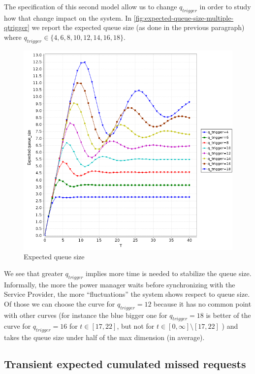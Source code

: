The specification of this second model allow us to change
$q_{trigger}$ in order to study how that change impact on the
system. In \autoref{fig:expected-queue-size-multiple-qtrigger} we
report the expected queue size (as done in the previous paragraph)
where $q_{trigger} \in \{4,6,8,10,12,14,16,18\}$.
\begin{figure}[htb]
  \centering
  \includegraphics[width=13cm]{quantitative-project/expected-queue-size-multi-q-triggers.png}
  \caption{Expected queue size}
  \label{fig:expected-queue-size-multiple-qtrigger}
\end{figure}
We see that greater $q_{trigger}$ implies more time is needed to
stabilize the queue size. Informally, the more the power manager waits
before synchronizing with the Service Provider, the more
``fluctuations'' the system shows respect to queue size. Of those we
can choose the curve for $q_{trigger}=12$ because it has no common
point with other curves (for instance the blue bigger one for
$q_{trigger}=18$ is better of the curve for $q_{trigger} = 16$ for
$t\in[17, 22]$, but not for $t\in[0,\infty]\setminus[17, 22]$ ) and
takes the queue size under half of the max dimension (in average).

\subsection{Transient expected cumulated missed requests }

